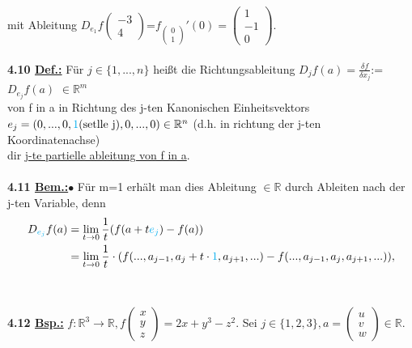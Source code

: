 \documentclass[]{scrartcl}
\begin{document}
	mit Ableitung \underline{\underline{$D_{e_1}f\begin{pmatrix}
			-3\\4
		\end{pmatrix}$}}=$f_{\begin{pmatrix}
		0\\1
		\end{pmatrix}}'(0)=\begin{pmatrix}
	1\\-1\\0
	\end{pmatrix}$.\\
	\\
	\textbf{4.10 \underline{Def.:}} Für $j\in\{1,...,n\}$ heißt die Richtungsableitung  \ul{$D_jf(a)=\frac{\delta f}{\delta x_j}$}:=\ul{$D_{e_j}f(a)$} $\in \mathbb{R}^m$\\
	von f in a in Richtung des j-ten Kanonischen Einheitsvektors $e_j = (0,...,0,\textcolor{cyan}{1}(\text{setlle j}),0,...,0)\in\mathbb{R}^n\\$
	(d.h. in richtung der j-ten Koordinatenachse)\\
	dir \ul{j-te partielle ableitung von f in a}.\\
	\\
	\textbf{4.11 \underline{Bem.:}}$\bullet$ Für m=1 erhält man dies Ableitung $\in \mathbb{R}$ durch Ableiten nach der j-ten Variable, denn 
	\begin{align}
		D_{\textcolor{cyan}{e_j}}f(a)&= \lim\limits_{t\rightarrow 0}\frac{1}{t}(f(a+t\textcolor{cyan}{e_j})-f(a))\\
		&=\lim\limits_{t\rightarrow0}\frac{1}{t}\cdot(f(...,a_{j-1},a_j+t\cdot\textcolor{cyan}{1}, a_{j+1},...)-f(...,a_{j-1},a_j,a_{j+1},...)),
	\end{align} \\
	\\
	\textbf{4.12 \underline{Bsp.:}} $ f:\mathbb{R}^3\rightarrow\mathbb{R}, 
	f\begin{pmatrix}
		x\\y\\z
	\end{pmatrix} = 2x+y^3-z^2.$ Sei $j\in \{1,2,3\}, a=\begin{pmatrix}
	u\\v\\w
\end{pmatrix} \in \mathbb{R}.$\\
\end{document}
